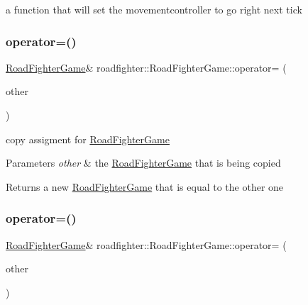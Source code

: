 a function that will set the movementcontroller to go right next tick \mbox{\label{classroadfighter_1_1RoadFighterGame_a2bfbab81a2304aa6c1e27571720ec431}} 
\subsubsection{\texorpdfstring{operator=()}{operator=()}\hspace{0.1cm}{\footnotesize\ttfamily [1/2]}}
{\footnotesize\ttfamily \hyperlink{classroadfighter_1_1RoadFighterGame}{Road\+Fighter\+Game}\& roadfighter\+::\+Road\+Fighter\+Game\+::operator= (\begin{DoxyParamCaption}\item[{\hyperlink{classroadfighter_1_1RoadFighterGame}{Road\+Fighter\+Game} \&}]{other }\end{DoxyParamCaption})\hspace{0.3cm}{\ttfamily [default]}}

copy assigment for \hyperlink{classroadfighter_1_1RoadFighterGame}{Road\+Fighter\+Game} 
\begin{DoxyParams}{Parameters}
{\em other} & the \hyperlink{classroadfighter_1_1RoadFighterGame}{Road\+Fighter\+Game} that is being copied \\
\hline
\end{DoxyParams}
\begin{DoxyReturn}{Returns}
a new \hyperlink{classroadfighter_1_1RoadFighterGame}{Road\+Fighter\+Game} that is equal to the other one 
\end{DoxyReturn}
\mbox{\label{classroadfighter_1_1RoadFighterGame_a8887e487ce6d91da4c380eee1d3d7051}} 
\subsubsection{\texorpdfstring{operator=()}{operator=()}\hspace{0.1cm}{\footnotesize\ttfamily [2/2]}}
{\footnotesize\ttfamily \hyperlink{classroadfighter_1_1RoadFighterGame}{Road\+Fighter\+Game}\& roadfighter\+::\+Road\+Fighter\+Game\+::operator= (\begin{DoxyParamCaption}\item[{\hyperlink{classroadfighter_1_1RoadFighterGame}{Road\+Fighter\+Game} \&\&}]{other }\end{DoxyParamCaption})\hspace{0.3cm}{\ttfamily [default]}}

